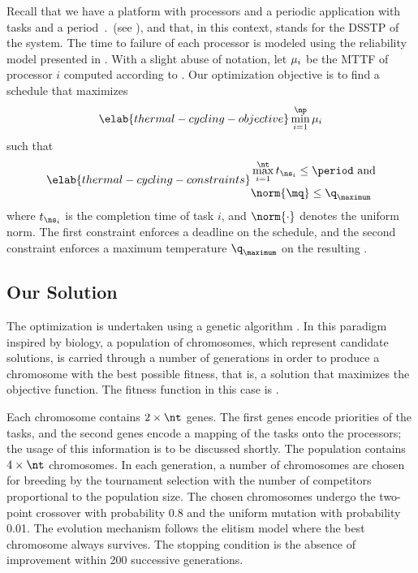 Recall that we have a platform with \np processors and a periodic application
with \nt tasks and a period $\period$ (see ), and that, in
this context, \mq stands for the \ac{DSSTP} of the system. The time to failure
of each processor is modeled using the reliability model presented in
. With a slight abuse of notation, let $\mu_i$ be the
\ac{MTTF} of processor $i$ computed according to .
Our optimization objective is to find a schedule that maximizes
\begin{equation} \elab{thermal-cycling-objective}
  \min_{i = 1}^\np \mean_i
\end{equation}
such that
\begin{align} \elab{thermal-cycling-constraints}
  \begin{split}
    & \max_{i = 1}^\nt t_{\ns_i} \leq \period \text{ and} \\
    & \norm{\mq} \leq \q_\maximum
  \end{split}
\end{align}
where $t_{\ns_i}$ is the completion time of task $i$, and $\norm{\cdot}$ denotes
the uniform norm. The first constraint enforces a deadline on the schedule, and
the second constraint enforces a maximum temperature $\q_\maximum$ on the
resulting \mq.

\subsection{Our Solution}

The optimization is undertaken using a genetic algorithm \cite{schmitz2004}. In
this paradigm inspired by biology, a population of chromosomes, which represent
candidate solutions, is carried through a number of generations in order to
produce a chromosome with the best possible fitness, that is, a solution that
maximizes the objective function. The fitness function in this case is
.

Each chromosome contains $2 \times \nt$ genes. The first \nt genes encode
priorities of the tasks, and the second \nt genes encode a mapping of the tasks
onto the processors; the usage of this information is to be discussed shortly.
The population contains $4 \times \nt$ chromosomes. In each generation, a number
of chromosomes are chosen for breeding by the tournament selection with the
number of competitors proportional to the population size. The chosen
chromosomes undergo the two-point crossover with probability 0.8 and the uniform
mutation with probability 0.01. The evolution mechanism follows the elitism
model where the best chromosome always survives. The stopping condition is the
absence of improvement within 200 successive generations.

